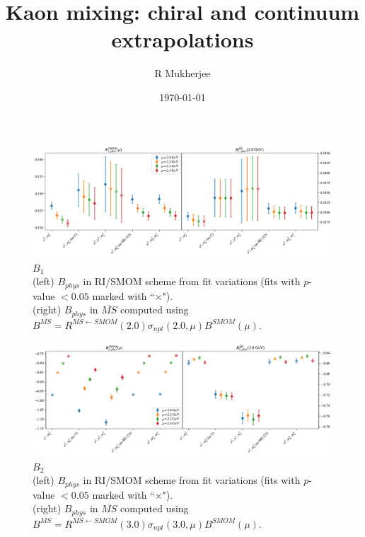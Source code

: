 \documentclass[12pt]{extarticle}
\title{Kaon mixing: chiral and continuum extrapolations}
\author{R Mukherjee}
\date{\today}
\begin{document}
\maketitle
\tableofcontents
\clearpage
\begin{figure}
\centering
\includegraphics[page=1, width=1.1\textwidth]{VVpAA/SUSY_F/fit_summary.pdf}
\caption{$B_{1}$\\(left) $B_{phys}$ in RI/SMOM scheme from fit variations (fits with $p$-value $<0.05$ marked with ``$\times$"). \\(right) $B_{phys}$ in $\overline{MS}$ computed using $B^{\overline{MS}} = R^{\overline{MS}\leftarrow SMOM}(2.0)\sigma_{npt}(2.0,\mu) B^{SMOM}(\mu)$.}
\end{figure}
\clearpage
\begin{figure}
\centering
\includegraphics[page=1, width=1.1\textwidth]{VVmAA/SUSY_F/fit_summary.pdf}
\caption{$B_{2}$\\(left) $B_{phys}$ in RI/SMOM scheme from fit variations (fits with $p$-value $<0.05$ marked with ``$\times$"). \\(right) $B_{phys}$ in $\overline{MS}$ computed using $B^{\overline{MS}} = R^{\overline{MS}\leftarrow SMOM}(3.0)\sigma_{npt}(3.0,\mu) B^{SMOM}(\mu)$.}
\end{figure}
\clearpage
\end{document}
